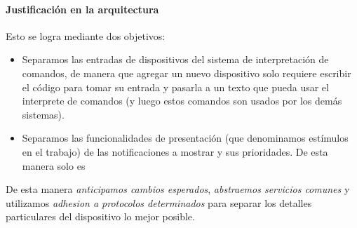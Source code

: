 \paragraph{Justificación en la arquitectura}

Esto se logra mediante dos objetivos:

\begin{itemize}
	\item 
		Separamos las entradas de dispositivos del sistema de interpretación de comandos, de manera que agregar
		un nuevo dispositivo solo requiere escribir el código para tomar su entrada y pasarla a un texto que
		pueda usar el interprete de comandos (y luego estos comandos son usados por los demás sistemas).
	\item 
		Separamos las funcionalidades de presentación (que denominamos estímulos en el trabajo) de las 
		notificaciones a mostrar y sus prioridades. De esta manera solo es 
\end{itemize}

De esta manera \textit{anticipamos cambios esperados}, \textit{abstraemos servicios comunes} y utilizamos
\textit{adhesion a protocolos determinados} para separar los detalles particulares del dispositivo lo mejor
posible.
